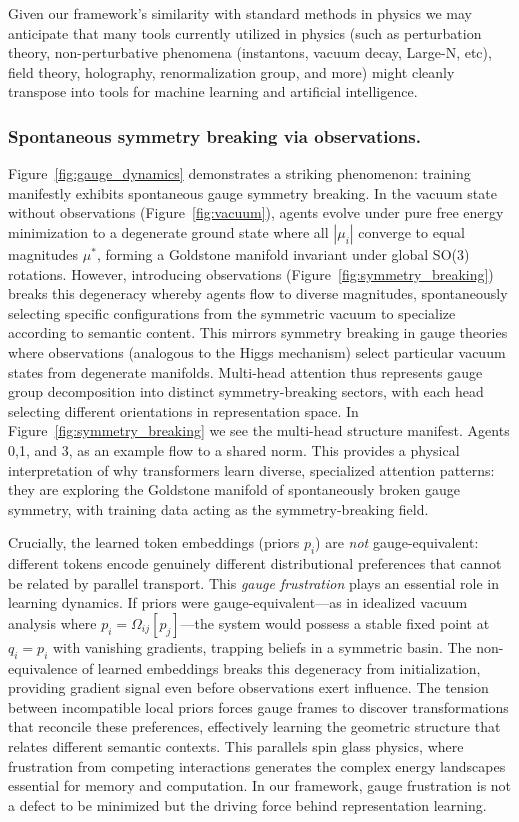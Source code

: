 \documentclass[twoside,11pt]{article}
\begin{document}
Given our framework's similarity with standard methods in physics we may anticipate that many tools currently utilized in physics (such as perturbation theory, non-perturbative phenomena (instantons, vacuum decay, Large-N, etc), field theory, holography, renormalization group, and more) might cleanly transpose into tools for machine learning and artificial intelligence.

\subsubsection{Spontaneous symmetry breaking via observations.}

Figure~\ref{fig:gauge_dynamics} demonstrates a striking phenomenon: training manifestly exhibits spontaneous gauge symmetry breaking. In the vacuum state without observations (Figure~\ref{fig:vacuum}), agents evolve under pure free energy minimization to a degenerate ground state where all $|\mu_i|$ converge to equal magnitudes $\mu^*$, forming a Goldstone manifold invariant under global SO(3) rotations. However, introducing observations (Figure~\ref{fig:symmetry_breaking}) breaks this degeneracy whereby agents flow to diverse magnitudes, spontaneously selecting specific configurations from the symmetric vacuum to specialize according to semantic content. This mirrors symmetry breaking in gauge theories where observations (analogous to the Higgs mechanism) select particular vacuum states from degenerate manifolds. Multi-head attention thus represents gauge group decomposition into distinct symmetry-breaking sectors, with each head selecting different orientations in representation space. In Figure~\ref{fig:symmetry_breaking} we see the multi-head structure manifest. Agents 0,1, and 3, as an example flow to a shared norm. This provides a physical interpretation of why transformers learn diverse, specialized attention patterns: they are exploring the Goldstone manifold of spontaneously broken gauge symmetry, with training data acting as the symmetry-breaking field.

Crucially, the learned token embeddings (priors $p_i$) are \emph{not} gauge-equivalent: different tokens encode genuinely different distributional preferences that cannot be related by parallel transport. This \emph{gauge frustration} plays an essential role in learning dynamics. If priors were gauge-equivalent---as in idealized vacuum analysis where $p_i = \Omega_{ij}[p_j]$---the system would possess a stable fixed point at $q_i = p_i$ with vanishing gradients, trapping beliefs in a symmetric basin. The non-equivalence of learned embeddings breaks this degeneracy from initialization, providing gradient signal even before observations exert influence. The tension between incompatible local priors forces gauge frames to discover transformations that reconcile these preferences, effectively learning the geometric structure that relates different semantic contexts. This parallels spin glass physics, where frustration from competing interactions generates the complex energy landscapes essential for memory and computation. In our framework, gauge frustration is not a defect to be minimized but the driving force behind representation learning.
\end{document}
